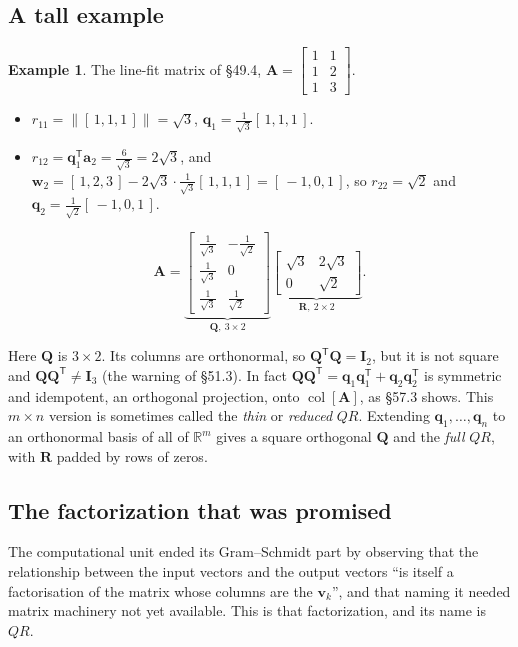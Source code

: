 \documentclass[11pt]{article}
\theoremstyle{plain}
\theoremstyle{definition}
\newtheorem{ex}{Example}[section]
\theoremstyle{remark}
\newcommand{\R}{\mathbb{R}}
\newcommand{\vc}[1]{\mathbf{#1}}
\newcommand{\mt}[1]{\mathbf{#1}}
\newcommand{\norm}[1]{\lVert #1\rVert}
\newcommand{\T}{^{\mathsf{T}}}
\newcommand{\colsp}[1]{\operatorname{col}[#1]}
\begin{document}
\subsection{A tall example}
\begin{ex}
\label{ex:qrtall}
The line-fit matrix of \S49.4, $\mt{A}=\begin{bmatrix}1&1\\1&2\\1&3\end{bmatrix}$.
\begin{itemize}[leftmargin=1.4em,itemsep=3pt]
  \item $r_{11}=\norm{[\,1,1,1\,]}=\sqrt3$, $\vc{q}_1=\frac{1}{\sqrt3}[\,1,1,1\,]$.
  \item $r_{12}=\vc{q}_1\T\vc{a}_2=\frac{6}{\sqrt3}=2\sqrt3$, and
        $\vc{w}_2=[\,1,2,3\,]-2\sqrt3\cdot\frac{1}{\sqrt3}[\,1,1,1\,]=[\,-1,0,1\,]$,
        so $r_{22}=\sqrt2$ and $\vc{q}_2=\frac{1}{\sqrt2}[\,-1,0,1\,]$.
\end{itemize}
\[
  \mt{A}=\underbrace{\begin{bmatrix}\frac{1}{\sqrt3}&-\frac{1}{\sqrt2}\\[3pt]
                                     \frac{1}{\sqrt3}&0\\[3pt]
                                     \frac{1}{\sqrt3}&\frac{1}{\sqrt2}\end{bmatrix}}_{\mt{Q},\ 3\times2}
  \underbrace{\begin{bmatrix}\sqrt3&2\sqrt3\\0&\sqrt2\end{bmatrix}}_{\mt{R},\ 2\times2}.
\]
\end{ex}

\noindent Here $\mt{Q}$ is $3\times2$. Its columns are orthonormal, so
$\mt{Q}\T\mt{Q}=\mt{I}_2$, but it is not square and $\mt{Q}\mt{Q}\T\neq\mt{I}_3$
(the warning of \S51.3). In fact
$\mt{Q}\mt{Q}\T=\vc{q}_1\vc{q}_1\T+\vc{q}_2\vc{q}_2\T$ is symmetric and idempotent,
an orthogonal projection, onto $\colsp{\mt{A}}$, as \S57.3 shows. This
$m\times n$ version is sometimes called the \emph{thin} or \emph{reduced} $QR$.
Extending $\vc{q}_1,\dots,\vc{q}_n$ to an orthonormal basis of all of $\R^{m}$
gives a square orthogonal $\mt{Q}$ and the \emph{full} $QR$, with $\mt{R}$ padded
by rows of zeros.

\subsection{The factorization that was promised}
The computational unit ended its Gram--Schmidt part by observing that the
relationship between the input vectors and the output vectors ``is itself a
factorisation of the matrix whose columns are the $\vc{v}_{k}$'', and that naming
it needed matrix machinery not yet available. This is that factorization, and
its name is $QR$.
\end{document}

